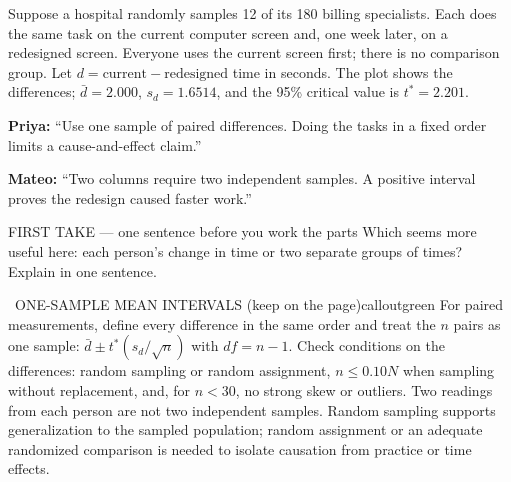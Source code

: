 \documentclass[11pt]{article}
\begin{document}


Suppose a hospital randomly samples 12 of its 180 billing specialists. Each does the same task on the current computer screen and, one week later, on a redesigned screen. Everyone uses the current screen first; there is no comparison group. Let $d=\text{current}-\text{redesigned}$ time in seconds. The plot shows the differences; $\bar d=2.000$, $s_d=1.6514$, and the 95\% critical value is $t^*=2.201$.\par\smallskip \textbf{Priya:} ``Use one sample of paired differences. Doing the tasks in a fixed order limits a cause-and-effect claim.''\par \textbf{Mateo:} ``Two columns require two independent samples. A positive interval proves the redesign caused faster work.''\par
\begin{center}
\end{center}
\begin{firsttakebox}{FIRST TAKE --- one sentence before you work the parts}
Which seems more useful here: each person's change in time or two separate groups of times? Explain in one sentence.
\workspace{0.9in}
\end{firsttakebox}

\begin{callout}{\IconBook\ ONE-SAMPLE MEAN INTERVALS (keep on the page)}{calloutgreen}
For paired measurements, define every difference in the same order and treat the $n$ pairs as
one sample: $\bar d\pm t^*(s_d/\sqrt n)$ with $df=n-1$. Check conditions on the differences:
random sampling or random assignment, $n\leq0.10N$ when sampling without replacement, and,
for $n<30$, no strong skew or outliers. Two readings from each person are not two independent
samples. Random sampling supports generalization to the sampled population; random assignment
or an adequate randomized comparison is needed to isolate causation from practice or time effects.
\end{callout}
\end{document}
